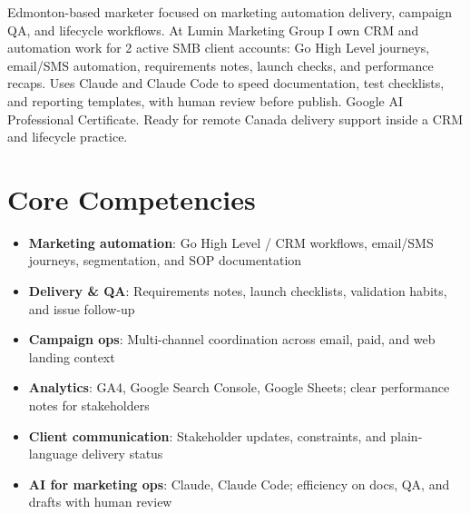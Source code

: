 \documentclass[11pt,a4paper,sans]{moderncv}
\begin{document}
\makecvtitle

\vspace{6pt}
\small{Edmonton-based marketer focused on marketing automation delivery, campaign QA, and lifecycle workflows. At Lumin Marketing Group I own CRM and automation work for 2 active SMB client accounts: Go High Level journeys, email/SMS automation, requirements notes, launch checks, and performance recaps. Uses Claude and Claude Code to speed documentation, test checklists, and reporting templates, with human review before publish. Google AI Professional Certificate. Ready for remote Canada delivery support inside a CRM and lifecycle practice.}

\section{Core Competencies}
\vspace{1pt}
\begin{itemize}
\item \textbf{Marketing automation}: Go High Level / CRM workflows, email/SMS journeys, segmentation, and SOP documentation
\item \textbf{Delivery \& QA}: Requirements notes, launch checklists, validation habits, and issue follow-up
\item \textbf{Campaign ops}: Multi-channel coordination across email, paid, and web landing context
\item \textbf{Analytics}: GA4, Google Search Console, Google Sheets; clear performance notes for stakeholders
\item \textbf{Client communication}: Stakeholder updates, constraints, and plain-language delivery status
\item \textbf{AI for marketing ops}: Claude, Claude Code; efficiency on docs, QA, and drafts with human review
\end{itemize}
\end{document}
